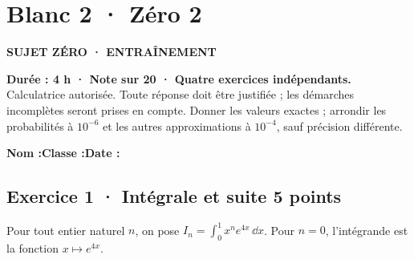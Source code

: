\fi

\clearpage{}\label{sujet:8-2}

\section*{Blanc 2 · Zéro 2}

{\sffamily\bfseries\color{teal}SUJET ZÉRO · ENTRAÎNEMENT\par}

\textbf{Durée : 4 h · Note sur 20 · Quatre exercices indépendants.}\\Calculatrice autorisée. Toute réponse doit être justifiée ; les démarches incomplètes seront prises en compte. Donner les valeurs exactes ; arrondir les probabilités à $10^{-6}$ et les autres approximations à $10^{-4}$, sauf précision différente.

\smallskip\textbf{Nom :}\enspace\dotfill\quad\textbf{Classe :}\enspace\dotfill\quad\textbf{Date :}\enspace\dotfill

\subsection*{Exercice 1 · Intégrale et suite \hfill 5 points}Pour tout entier naturel $n$, on pose $I_n=\displaystyle\int_0^1x^ne^{4x}\,\dd x$. Pour $n=0$, l'intégrande est la fonction $x\mapsto e^{4x}$.

